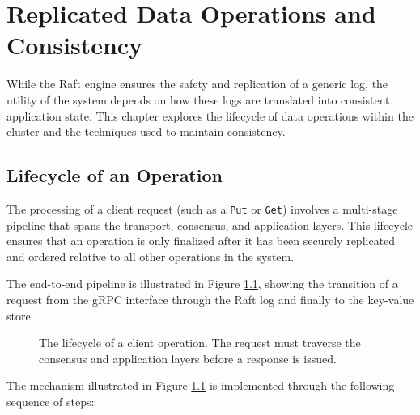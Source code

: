 \chapter{Replicated Data Operations and Consistency}
\label{ch:data_operations}

While the Raft engine ensures the safety and replication of a generic log, the utility of the system depends on how these logs are translated into consistent application state. This chapter explores the lifecycle of data operations within the cluster and the techniques used to maintain consistency.

\section{Lifecycle of an Operation}
The processing of a client request (such as a \texttt{Put} or \texttt{Get}) involves a multi-stage pipeline that spans the transport, consensus, and application layers. This lifecycle ensures that an operation is only finalized after it has been securely replicated and ordered relative to all other operations in the system.

The end-to-end pipeline is illustrated in Figure \ref{fig:operation_lifecycle}, showing the transition of a request from the gRPC interface through the Raft log and finally to the key-value store.

\begin{figure}[h]
    \centering
    \caption{The lifecycle of a client operation. The request must traverse the consensus and application layers before a response is issued.}
    \label{fig:operation_lifecycle}
\end{figure}

The mechanism illustrated in Figure \ref{fig:operation_lifecycle} is implemented through the following sequence of steps:

